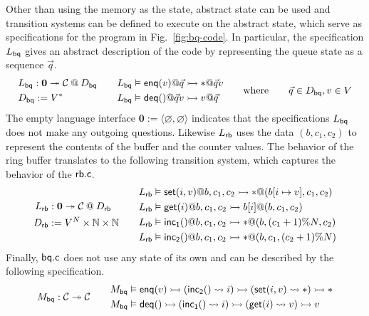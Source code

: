 Other than using the memory as the state,
abstract state can be used
and transition systems can be defined
to execute on the abstract state,
which serve as specifications for the program in Fig.~\ref{fig:bq-code}.
In particular,
the specification $L_{ \mathsf{bq} }$
gives an abstract description of the code
by representing the queue state as a sequence $\vec{q}$.
\[
  \begin{aligned}
    & L_\kw{bq} : \mathbf{0} \twoheadrightarrow \C \mathbin@ D_\kw{bq} \\
    & D_\kw{bq} := V^*
  \end{aligned}
  \qquad
  \begin{aligned}
    L_\kw{bq} & \vDash \kw{enq}(v)@\vec{q} \rightarrowtail *@\vec{q}v \\
    L_\kw{bq} & \vDash \kw{deq}()@\vec{q}v \rightarrowtail v@\vec{q}
  \end{aligned}
  \qquad\text{where}\qquad
  \vec{q} \in D_\kw{bq},
  v \in V
\]
The empty language interface $\mathbf{0} := \langle \varnothing, \varnothing
\rangle$ indicates that the specifications $L_{ \mathsf{bq} }$ does not make any
outgoing questions.
Likewise $L_{ \mathsf{rb} }$ uses the data $(b, c_1, c_2)$
to represent the contents of the buffer and the counter values.
The behavior of the ring buffer
translates to the following transition system,
which captures the behavior of the $ \mathsf{rb.c} $.
\[
  \begin{aligned}
    L_\kw{rb}& : \mathbf{0} \twoheadrightarrow \C \mathbin@ D_\kw{rb}\\
    D_\kw{rb}& := V^N \times \mathbb{N} \times \mathbb{N}
  \end{aligned}
  \qquad
  \begin{aligned}
    L_\kw{rb} & \vDash \kw{set}(i, v)@b, c_1, c_2
    \rightarrowtail *@(b[i \mapsto v], c_1, c_2) \\
    L_\kw{rb} & \vDash \kw{get}(i)@b, c_1, c_2
    \rightarrowtail b[i]@(b, c_1, c_2)\\
    L_\kw{rb} & \vDash \kw{inc_1}()@b, c_1, c_2
    \rightarrowtail *@(b, (c_1 + 1) \% N, c_2) \\
    L_\kw{rb} & \vDash \kw{inc_2}()@b, c_1, c_2
    \rightarrowtail *@(b, c_1, (c_2 + 1) \% N)
  \end{aligned}
\]
Finally,
$ \mathsf{bq.c} $ does not use any state of its own
and can be described by the following specification.
\[
  M_{ \mathsf{bq} } :  \mathcal{C}  \twoheadrightarrow  \mathcal{C} 
  \qquad
  \begin{aligned}
    M_{ \mathsf{bq} } & \vDash  \mathsf{enq} (v) \rightarrowtail
    ( \mathsf{inc_2} () \leadsto i) \rightarrowtail
    ( \mathsf{set} (i, v) \leadsto *) \rightarrowtail
    * \\
    M_{ \mathsf{bq} } & \vDash  \mathsf{deq} () \rightarrowtail
    ( \mathsf{inc_1} () \leadsto i) \rightarrowtail
    ( \mathsf{get} (i) \leadsto v) \rightarrowtail
    v
  \end{aligned}
\]

